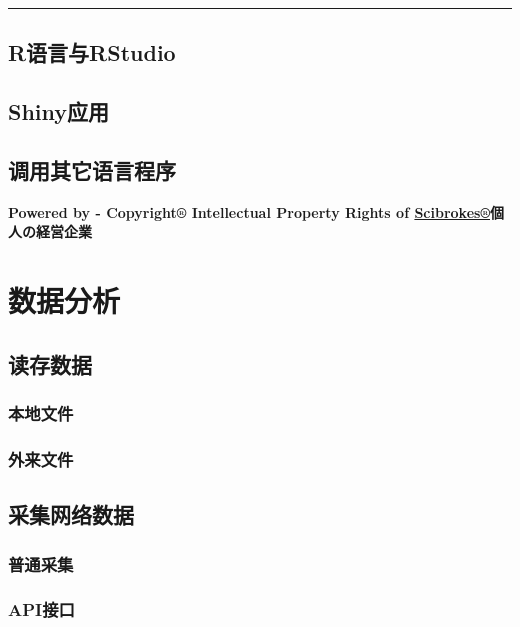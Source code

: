 \documentclass[]{book}
\theoremstyle{definition}
\theoremstyle{definition}
\theoremstyle{definition}
\theoremstyle{remark}
\begin{document}
\begin{center}\rule{0.5\linewidth}{\linethickness}\end{center}

\hypertarget{rrstudio}{%
\section{R语言与RStudio}\label{rrstudio}}

\hypertarget{shiny}{%
\section{Shiny应用}\label{shiny}}

\section{调用其它语言程序}

\textbf{Powered by - Copyright® Intellectual Property Rights of
\href{http://www.scibrokes.com}{Scibrokes®}個人の経営企業}

\hypertarget{analytics}{%
\chapter{数据分析}\label{analytics}}

\section{读存数据}

\subsection{本地文件}

\subsection{外来文件}

\section{采集网络数据}

\subsection{普通采集}

\hypertarget{api}{%
\subsection{API接口}\label{api}}
\end{document}
